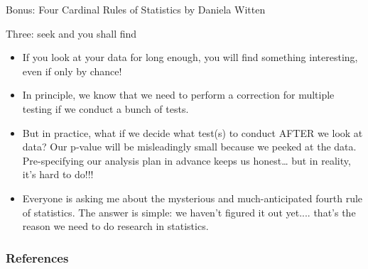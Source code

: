 \documentclass[handout]{beamer}
\begin{document}
\begin{frame}{Bonus: Four Cardinal Rules of Statistics by Daniela Witten}
\scriptsize{


\begin{block}{Three: seek and you shall find}
\begin{itemize}
 \item If you look at your data for long enough, you will find something interesting, even if only by chance! 
 \item  In principle, we know that we need to perform a correction for multiple testing if we conduct a bunch of tests.
\item But in practice, what if we decide what test(s) to conduct AFTER we look at data?  Our p-value will be misleadingly small because we peeked at the data.  Pre-specifying our analysis plan in advance keeps us honest… but in reality, it’s hard to do!!!
\end{itemize}

 
\end{block}


\begin{itemize}
\item Everyone is asking me about the mysterious and much-anticipated fourth rule of statistics. The answer is simple: we haven’t figured it out yet.... that’s the reason we need to do research in statistics.
\end{itemize}

} 
\end{frame}

\begin{frame}[allowframebreaks]\scriptsize
\frametitle{References}


%
\end{frame}  





\end{document}
